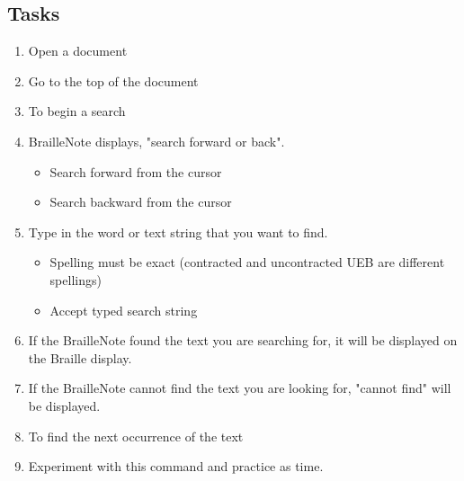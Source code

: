 \documentclass[10pt,letterpaper,twoside]{report}
\begin{document}
\subsection{Tasks}
\begin{enumerate}
	\item Open a document
	\item Go to the top of the document 
	\item To begin a search 
	\item BrailleNote displays, "search forward or back".
	      \begin{itemize}
		      \item Search forward from the cursor 
		      \item Search backward from the cursor 
	      \end{itemize}
	\item Type in the word or text string that you want to find.
	      \begin{itemize}
		      \item Spelling must be exact (contracted and uncontracted UEB are different spellings)
		      \item Accept typed search string 
	      \end{itemize}
	\item If the BrailleNote found the text you are searching for, it will be displayed on the Braille display.
	\item If the BrailleNote cannot find the text you are looking for, "cannot find" will be displayed.
	\item To find the next occurrence of the text 
	\item Experiment with this command and practice as time.
\end{enumerate}

\clearpage
\end{document}
